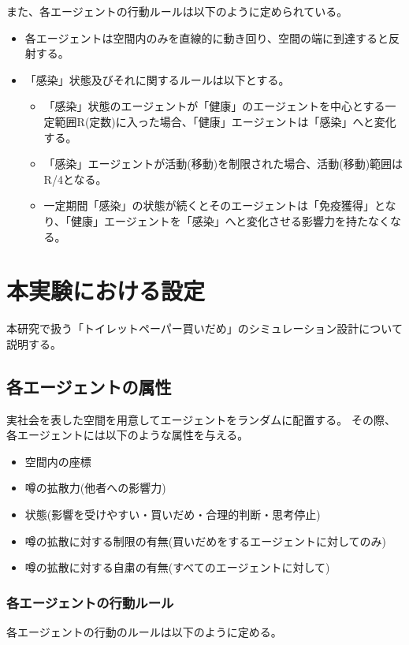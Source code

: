 また、各エージェントの行動ルールは以下のように定められている。

\begin{itemize}
  \item 各エージェントは空間内のみを直線的に動き回り、空間の端に到達すると反射する。
  \item 「感染」状態及びそれに関するルールは以下とする。
  \begin{itemize}
    \item 「感染」状態のエージェントが「健康」のエージェントを中心とする一定範囲R(定数)に入った場合、「健康」エージェントは「感染」へと変化する。
    \item 「感染」エージェントが活動(移動)を制限された場合、活動(移動)範囲はR/4となる。
    \item 一定期間「感染」の状態が続くとそのエージェントは「免疫獲得」となり、「健康」エージェントを「感染」へと変化させる影響力を持たなくなる。
  \end{itemize}  
\end{itemize}

\section{本実験における設定}
本研究で扱う「トイレットペーパー買いだめ」のシミュレーション設計について説明する。

\subsection{各エージェントの属性}
実社会を表した空間を用意してエージェントをランダムに配置する。
その際、各エージェントには以下のような属性を与える。

\begin{itemize}
  \item 空間内の座標
  \item 噂の拡散力(他者への影響力)
  \item 状態(影響を受けやすい・買いだめ・合理的判断・思考停止)
  \item 噂の拡散に対する制限の有無(買いだめをするエージェントに対してのみ)
  \item 噂の拡散に対する自粛の有無(すべてのエージェントに対して)

\end{itemize}

\subsubsection{各エージェントの行動ルール}
各エージェントの行動のルールは以下のように定める。

